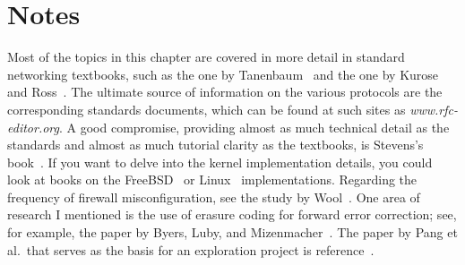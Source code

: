 \section*{Notes}
Most of the topics in this chapter are covered in more detail in
standard networking textbooks, such as the one by
Tanenbaum~\cite{max1150} and the one by Kurose and
Ross~\cite{max1151}.  The ultimate source of information on the
various protocols are the corresponding standards documents, which can
be found at such sites as \textit{www.rfc-editor.org}.  A good compromise,
providing almost as much technical detail as the standards and almost
as much tutorial clarity as the textbooks, is Stevens's
book~\cite{max1152}.  If you want to delve into the kernel
implementation details, you could look at books on the
FreeBSD~\cite{max1153} or Linux~\cite{max1154} implementations.
Regarding the frequency of firewall misconfiguration, see the study by Wool~\cite{max1146}.
One area of research I mentioned is the use of erasure coding for
forward error correction; see, for example, the paper by Byers, Luby,
and Mizenmacher~\cite{max1155}.  The paper by Pang et al.\ that
serves as the basis for an exploration project is reference~\cite{max1156}.
